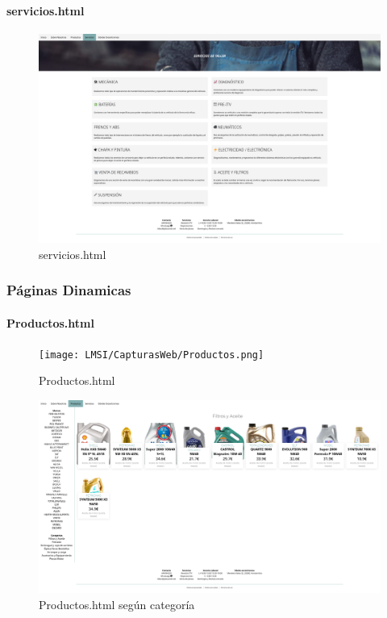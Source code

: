 \documentclass{article}
\begin{document}
\paragraph{servicios.html}
\begin{figure}[H]
  \centering
  \includegraphics[width=1.0\textwidth]{LMSI/CapturasWeb/Servicios.png}
  \caption{servicios.html}
\end{figure}
\subsubsection{Páginas Dinamicas}

\paragraph{Productos.html}
\begin{figure}[H]
  \centering
  \texttt{[image: LMSI/CapturasWeb/Productos.png]}
  \caption{Productos.html}
\end{figure}
\begin{figure}[H]
  \centering
  \includegraphics[width=1.0\textwidth]{LMSI/CapturasWeb/ProductosFiltrado.png}
  \caption{Productos.html según categoría}
\end{figure}
\end{document}
